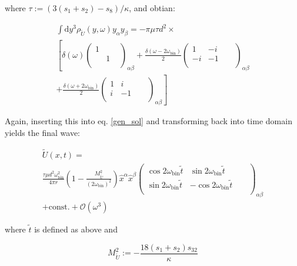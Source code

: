 \documentclass[11pt]{article}
\begin{document}
where $\tau := \left( 3 \left( s_1 + s_2\right) - s_8 \right) / \kappa$, and 
obtian:

\begin{multline}
	\int \mathrm{d}y^3 \rho_{\tilde U} \left( y , \omega \right) 
	y_\alpha y_\beta
	=
	- \pi \mu \tau d^2 \times
	\\
	\left[
	\delta\left( \omega \right)
	\begin{pmatrix}
	1 & & \\ & 1 & \\ & &
	\end{pmatrix}_{\alpha \beta}
	\right.
	+
	\frac{\delta \left( \omega - 2 \omega_{\text{bin}} \right)}{2}
	\begin{pmatrix}
	1 & -i & \\ -i & -1 & \\ & & &
	\end{pmatrix}_{\alpha \beta}
	\\
	\left.
	+
	\frac{\delta \left( \omega + 2 \omega_{\text{bin}} \right)}{2}
	\begin{pmatrix}
	1 & i & \\ i & -1 & \\ & & &
	\end{pmatrix}_{\alpha \beta}
	\right]
\end{multline}

Again, inserting this into eq. \ref{gen_sol} and transforming back into time domain yields the final wave:

\begin{multline} \label{sol_Us}
	\tilde U \left( x, t\right)
	=
	\\
	\frac{\tau \mu d^2 \omega_{\text{bin}}^2}{4 \pi r}
	\left(
		1 - \frac{M^2_{\tilde U} }{ \left( 2 \omega_{\text{bin}}\right)^2}
	\right)
	\hat x^\alpha 
	\hat x^\beta
	\begin{pmatrix}
		\cos{2 \omega_{\text{bin}} \tilde t}
		 & \sin{2 \omega_{\text{bin}} \tilde t}
		 &
		 \\
		 \sin{2 \omega_{\text{bin}} \tilde t}
		 & - \cos{2 \omega_{\text{bin}} \tilde t}
		 &
		 \\
		 &
		 &
		 &
	\end{pmatrix}_{\alpha \beta}
	\\
	+ \text{const.}
	+ \mathcal{O} \left( \omega^3 \right)
\end{multline}

where $\tilde t$ is defined as above and 

\begin{equation}
	M_{\tilde U}^2 := - \frac{18 \left( s_1 + s_2 \right) s_{32} }{\kappa}
\end{equation}
\end{document}
